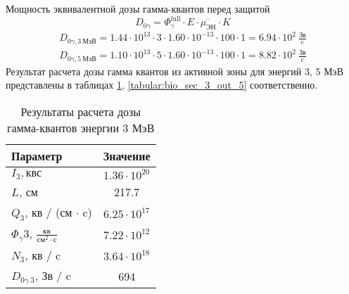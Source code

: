 \noindent Мощность эквивалентной дозы гамма-квантов перед защитой
\begin{equation}
        D_{0\gamma}=\Phi_\gamma^{\text{full}} \cdot E \cdot \overline{\mu_{\text{ЭН}}} \cdot K
\end{equation}
\begin{align*}
        D_{0\gamma, 3\ \text{МэВ}} = 1.44 \cdot 10^{{ 13 }} \cdot 3 \cdot 1.60 \cdot 10^{{ -13 }} \cdot 100 \cdot 1 = 6.94 \cdot 10^{{ 2 }}\ \frac{\text{Зв}}{\text{c}} \\
        D_{0\gamma, 5\ \text{МэВ}} = 1.10 \cdot 10^{{ 13 }} \cdot 5 \cdot 1.60 \cdot 10^{{ -13 }} \cdot 100 \cdot 1 = 8.82 \cdot 10^{{ 2 }}\ \frac{\text{Зв}}{\text{c}}
\end{align*}
Результат расчета дозы гамма квантов из активной зоны для энергий 3, 5 МэВ представлены в таблицах \ref{tabular:bio_sec_3_out_3}, \ref{tabular:bio_sec_3_out_5} соответственно.

\begin{table}[H]
	\caption{Результаты расчета дозы гамма-квантов энергии 3 МэВ}
	\begin{center}
        \begin{tabular}{|l|c|}
        \toprule
         Параметр & Значение \\
         \midrule
         \hline
         $I_3, \text{кв}{с}$ & $1.36 \cdot 10^{20}$ \\
         \hline
         $L$, см & 217.7 \\
         \hline
         $Q_3$, кв / (см $\cdot$ c)  & $6.25 \cdot 10^{17}$ \\
         \hline
         $\Phi_\gamma 3$, $\frac{\text{кв}}{\text{см}^2 \cdot \text{с}}$ & $7.22 \cdot 10^{12}$ \\
         \hline
         $N_3$, кв / c & $3.64 \cdot 10^{18}$ \\ 
         \hline
         $D_{0\gamma\ 3}$, Зв / c & 694\\
         \hline
         \bottomrule
		\end{tabular}
		\label{tabular:bio_sec_3_out_3}
	\end{center}
\end{table}

